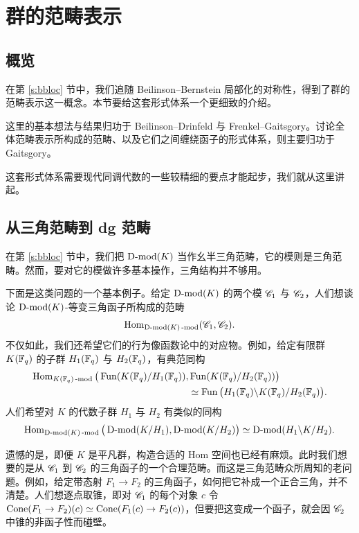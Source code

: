 \section{群的范畴表示}
\label{s:catrepgrp}

\subsection{概览}

\ssszh 在第 \ref{s:bbloc} 节中，我们追随 Beilinson--Bernstein 局部化的对称性，得到了群的范畴表示这一概念。本节要给这套形式体系一个更细致的介绍。

这里的基本想法与结果归功于 Beilinson--Drinfeld 与 Frenkel--Gaitsgory。讨论全体范畴表示所构成的范畴、以及它们之间缠绕函子的形式体系，则主要归功于 Gaitsgory。

这套形式体系需要现代同调代数的一些较精细的要点才能起步，我们就从这里讲起。

\subsection{从三角范畴到 dg 范畴}

\ssszh 在第 \ref{s:bbloc} 节中，我们把 $\operatorname{D-mod}(K)$ 当作幺半三角范畴，它的模则是三角范畴。然而，要对它的模做许多基本操作，三角结构并不够用。

下面是这类问题的一个基本例子。给定 $\operatorname{D-mod}(K)$ 的两个模 $\mathscr{C}_1$ 与 $\mathscr{C}_2$，人们想谈论 $\operatorname{D-mod}(K)$-等变三角函子所构成的范畴
%
\[
   \operatorname{Hom}_{\operatorname{D-mod}(K)\operatorname{-mod}}(\mathscr{C}_1, \mathscr{C}_2).
\]
%
不仅如此，我们还希望它们的行为像函数论中的对应物。例如，给定有限群 $K(\mathbb{F}_q)$ 的子群 $H_1(\mathbb{F}_q)$ 与 $H_2(\mathbb{F}_q)$，有典范同构
%
\begin{align*}
  \operatorname{Hom}_{K(\mathbb{F}_q)\operatorname{-mod}}\big(\operatorname{Fun}(K(\mathbb{F}_q)/H_1(\mathbb{F}_q)),&\operatorname{Fun}(K(\mathbb{F}_q)/H_2(\mathbb{F}_q))
  \big)\\
  &\simeq
 \operatorname{Fun}\big( H_1(\mathbb{F}_q) \backslash K(\mathbb{F}_q) / H_2(\mathbb{F}_q)\big).
\end{align*}
%
人们希望对 $K$ 的代数子群 $H_1$ 与 $H_2$ 有类似的同构
%
\begin{align*}
\operatorname{Hom}_{\operatorname{D-mod}(K)\operatorname{-mod}}\big(\operatorname{D-mod}(K/H_1),\operatorname{D-mod}(K/H_2)
\big)
\simeq
\operatorname{D-mod}( H_1 \backslash K / H_2).
\end{align*}
%

遗憾的是，即便 $K$ 是平凡群，构造合适的 Hom 空间也已经有麻烦。此时我们想要的是从 $\mathscr{C}_1$ 到 $\mathscr{C}_2$ 的三角函子的一个合理范畴。而这是三角范畴众所周知的老问题。例如，给定带态射 $F_1 \rightarrow F_2$ 的三角函子，如何把它补成一个正合三角，并不清楚。人们想逐点取锥，即对 $\mathscr{C}_1$ 的每个对象 $c$ 令 $\operatorname{Cone}(F_1 \rightarrow F_2)(c) \simeq \operatorname{Cone}(F_1(c) \rightarrow F_2(c))$，但要把这变成一个函子，就会因 $\mathscr{C}_2$ 中锥的非函子性而碰壁。

